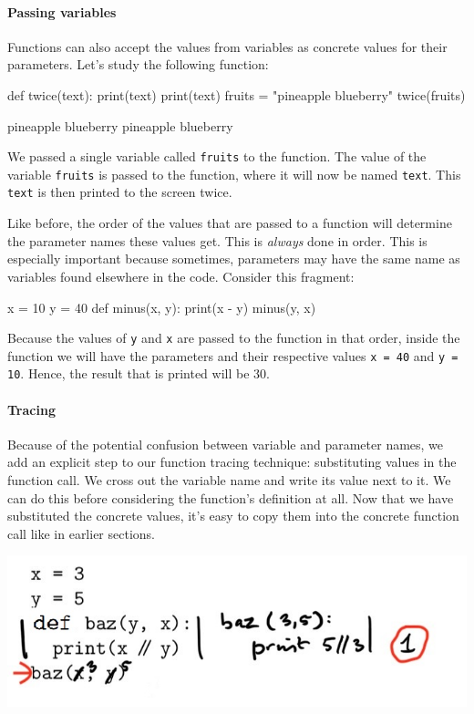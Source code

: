 \paragraph{Passing variables}

Functions can also accept the values from variables as concrete values for their parameters. Let's study the following function:

\begin{minipage}[t]{0.45\textwidth}
\vspace{-3pt}
\begin{nllisting}
def twice(text):
    print(text)
    print(text)
fruits = "pineapple blueberry"
twice(fruits)
\end{nllisting}
\end{minipage}
\begin{minipage}[t]{0.45\textwidth}
\vspace{0pt}
\begin{listing}
pineapple blueberry
pineapple blueberry
\end{listing}
\end{minipage}

We passed a single variable called \texttt{fruits} to the function. The value of the variable \texttt{fruits} is passed to the function, where it will now be named \texttt{text}. This \texttt{text} is then printed to the screen twice.

Like before, the order of the values that are passed to a function will determine the parameter names these values get. This is \emph{always} done in order. This is especially important because sometimes, parameters may have the same name as variables found elsewhere in the code. Consider this fragment:

\begin{nnflisting}
x = 10
y = 40
def minus(x, y):
    print(x - y)
minus(y, x)
\end{nnflisting}

Because the values of \texttt{y} and \texttt{x} are passed to the function in that order, inside the function we will have the parameters and their respective values \texttt{x = 40} and \texttt{y = 10}. Hence, the result that is printed will be 30.

\paragraph{Tracing}

Because of the potential confusion between variable and parameter names, we add an explicit step to our function tracing technique: substituting values in the function call. We cross out the variable name and write its value next to it. We can do this before considering the function's definition at all. Now that we have substituted the concrete values, it's easy to copy them into the concrete function call like in earlier sections.

\includegraphics[width=.8\textwidth]{3-trace-varsparams.jpeg}
